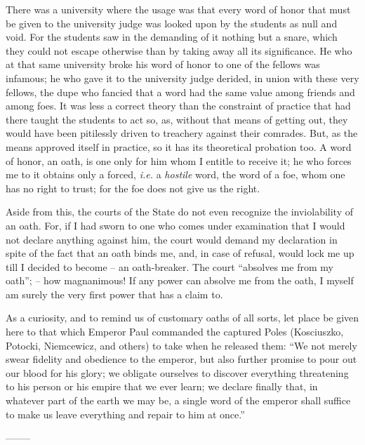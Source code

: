 There was a university where the usage was that every word of honor that must 
be given to the university judge was looked upon by the students as null and 
void. For the students saw in the demanding of it nothing but a snare, which 
they could not escape otherwise than by taking away all its significance. He 
who at that same university broke his word of honor to one of the fellows was 
infamous; he who gave it to the university judge derided, in union with these 
very fellows, the dupe who fancied that a word had the same value among 
friends and among foes. It was less a correct theory than the constraint of 
practice that had there taught the students to act so, as, without that means 
of getting out, they would have been pitilessly driven to treachery against 
their comrades. But, as the means approved itself in practice, so it has its 
theoretical probation too. A word of honor, an oath, is one only for him whom 
I entitle to receive it; he who forces me to it obtains only a forced, 
\textit{i.e.} a \textit{hostile} word, the word of a foe, whom one has no 
right to trust; for the foe does not give us the right.

Aside from this, the courts of the State do not even recognize the 
inviolability of an oath. For, if I had sworn to one who comes under 
examination that I would not declare anything against him, the court would 
demand my declaration in spite of the fact that an oath binds me, and, in case 
of refusal, would lock me up till I decided to become -- an oath-breaker. The 
court ``absolves me from my oath''; -- how magnanimous! If any power can 
absolve me from the oath, I myself am surely the very first power that has a 
claim to.

As a curiosity, and to remind us of customary oaths of all sorts, let place be 
given here to that which Emperor Paul commanded the captured Poles 
(Kosciuszko, Potocki, Niemcewicz, and others) to take when he released them: 
``We not merely swear fidelity and obedience to the emperor, but also further 
promise to pour out our blood for his glory; we obligate ourselves to discover 
everything threatening to his person or his empire that we ever learn; we 
declare finally that, in whatever part of the earth we may be, a single word 
of the emperor shall suffice to make us leave everything and repair to him at 
once.''

\begin{center}
--------\end{center}


